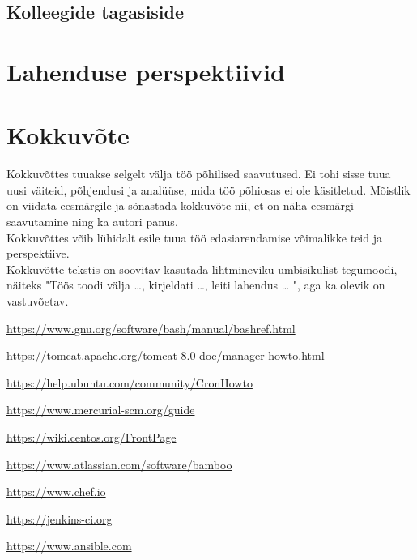 \documentclass[12pt]{report}
\begin{document}
  \subsection{Kolleegide tagasiside}
  
  \section{Lahenduse perspektiivid}
  
  \newpage
  
  \section*{Kokkuvõte}
  \label{kokkuvote}

Kokkuvõttes tuuakse selgelt välja töö põhilised saavutused. Ei tohi sisse tuua uusi väiteid, põhjendusi ja analüüse, mida töö põhiosas ei ole käsitletud. Mõistlik on viidata eesmärgile ja sõnastada kokkuvõte nii, et on näha eesmärgi saavutamine ning ka autori panus.\\

Kokkuvõttes võib lühidalt esile tuua töö edasiarendamise võimalikke teid ja perspektiive.\\

Kokkuvõtte tekstis on soovitav kasutada lihtmineviku umbisikulist tegumoodi, näiteks "Töös toodi välja …, kirjeldati …, leiti lahendus … ", aga ka olevik on vastuvõetav.

  \newpage
  
  \begin{thebibliography}{9}
    \label{kasutatud-materjalid}
  
    \url{https://www.gnu.org/software/bash/manual/bashref.html}
    
    \url{https://tomcat.apache.org/tomcat-8.0-doc/manager-howto.html}
  
    \url{https://help.ubuntu.com/community/CronHowto}
  
    \url{https://www.mercurial-scm.org/guide}
  
    \url{https://wiki.centos.org/FrontPage}
  
    \url{https://www.atlassian.com/software/bamboo}
  
    \url{https://www.chef.io}
  
    \url{https://jenkins-ci.org}
  
    \url{https://www.ansible.com}
 
  \end{thebibliography}
\end{document}
